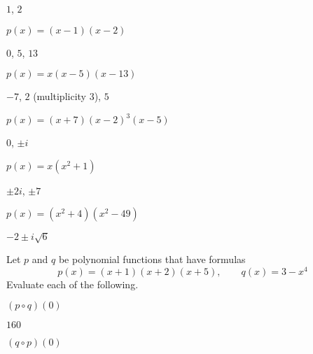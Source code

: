 \begin{exercises}
\begin{problem}
\begin{multicols}{3}
\begin{subproblem}
    $1$, $2$ 
        \begin{shortsolution}
            $p(x)=(x-1)(x-2)$
        \end{shortsolution}
    \end{subproblem}
    \begin{subproblem}
    $0$, $5$, $13$ 
        \begin{shortsolution}
            $p(x)=x(x-5)(x-13)$
        \end{shortsolution}
    \end{subproblem}
    \begin{subproblem}
    $-7$, $2$ (multiplicity $3$), $5$ 
        \begin{shortsolution}
            $p(x)=(x+7)(x-2)^3(x-5)$
        \end{shortsolution}
    \end{subproblem}
    \begin{subproblem}
    $0$, $\pm i$ 
        \begin{shortsolution}
            $p(x)=x(x^2+1)$
        \end{shortsolution}
    \end{subproblem}
    \begin{subproblem}
    $\pm 2i$, $\pm 7$ 
        \begin{shortsolution}
            $p(x)=(x^2+4)(x^2-49)$
        \end{shortsolution}
    \end{subproblem}
    \begin{subproblem}
     $-2\pm i\sqrt{6}$ 
    \end{subproblem}
\end{multicols}
\end{problem}
\begin{problem}
Let $p$ and $q$ be polynomial functions that have formulas
\[
    p(x)=(x+1)(x+2)(x+5), \qquad q(x)=3-x^4
\]
Evaluate each of the following.
\begin{multicols}{4}
    \begin{subproblem}
        $(p\circ q)(0)$ 
        \begin{shortsolution}
            $160$
        \end{shortsolution}
    \end{subproblem}
    \begin{subproblem}
        $(q\circ p)(0)$ 
        \begin{shortsolution}

\end{shortsolution}
\end{subproblem}
\end{multicols}
\end{problem}
\end{exercises}
